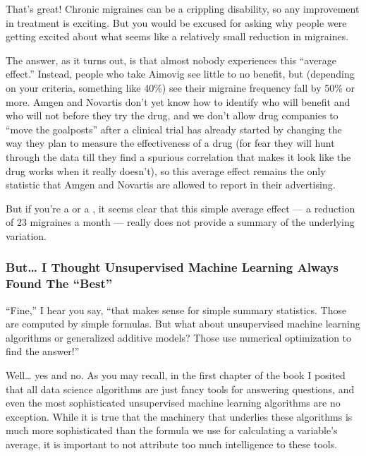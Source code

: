 \documentclass[letterpaper,10pt,english]{jupyterBook}
\begin{document}
\sphinxAtStartPar
{}

\sphinxAtStartPar
That’s great! Chronic migraines can be a crippling disability, so any improvement in treatment is exciting. But you would be excused for asking why people were getting  excited about what seems like a relatively small reduction in migraines.

\sphinxAtStartPar
The answer, as it turns out, is that almost nobody experiences this “average effect.” Instead,  people who take Aimovig see little to no benefit, but  (depending on your criteria, something like 40\%) see their migraine frequency fall by 50\% or more. Amgen and Novartis don’t yet know how to identify who will benefit and who will not before they try the drug, and we don’t allow drug companies to “move the goalposts” after a clinical trial has already started by changing the way they plan to measure the effectiveness of a drug (for fear they will hunt through the data till they find a spurious correlation that makes it look like the drug works when it really doesn’t), so this average effect remains the only statistic that Amgen and Novartis are allowed to report in their advertising.

\sphinxAtStartPar
But if you’re a  or a , it seems clear that this simple average effect — a reduction of 2\sphinxhyphen{}3 migraines a month — really does not provide a  summary of the underlying variation.


\subsubsection{But… I Thought Unsupervised Machine Learning Always Found The “Best”}
\label{\detokenize{30_questions/18_exploratory_internal_faithful:but-i-thought-unsupervised-machine-learning-always-found-the-best}}
\sphinxAtStartPar
“Fine,” I hear you say, “that makes sense for simple summary statistics. Those are computed by simple formulas. But what about unsupervised machine learning algorithms or generalized additive models? Those use numerical optimization to find the  answer!”

\sphinxAtStartPar
Well… yes and no. As you may recall, in the first chapter of the book I posited that all data science algorithms are just fancy tools for answering questions, and even the most sophisticated unsupervised machine learning algorithms are no exception. While it is true that the machinery that underlies these algorithms is much more sophisticated than the formula we use for calculating a variable’s average, it is important to not attribute too much intelligence to these tools.
\end{document}
